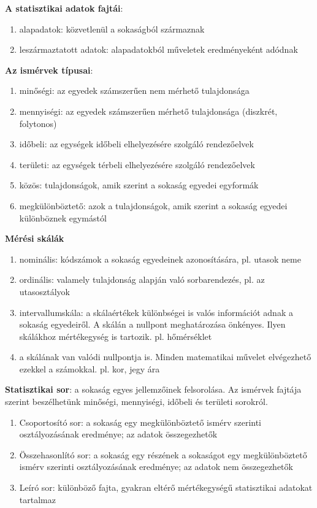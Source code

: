 \documentclass[12pt]{article}
\begin{document}
    \textbf{A statisztikai adatok fajtái}:
    \begin{enumerate}
        \item alapadatok: közvetlenül a sokaságból származnak
        \item leszármaztatott adatok: alapadatokból műveletek eredményeként adódnak
    \end{enumerate}

    \textbf{Az ismérvek típusai}:
    \begin{enumerate}
        \item minőségi: az egyedek számszerűen nem mérhető tulajdonsága
        \item mennyiségi: az egyedek számszerűen mérhető tulajdonsága (diszkrét, folytonos)
        \item időbeli: az egységek időbeli elhelyezésére szolgáló rendezőelvek
        \item területi: az egységek térbeli elhelyezésére szolgáló rendezőelvek
        \item közös: tulajdonságok, amik szerint a sokaság egyedei egyformák
        \item megkülönböztető: azok a tulajdonságok, amik szerint a sokaság egyedei különböznek egymástól
    \end{enumerate}

    \textbf{Mérési skálák}
    \begin{enumerate}
        \item nominális: kódszámok a sokaság egyedeinek azonosítására, pl. utasok neme
        \item ordinális: valamely tulajdonság alapján való sorbarendezés, pl. az utasosztályok
        \item intervallumskála: a skálaértékek különbségei is valós információt adnak a sokaság egyedeiről. A skálán a nullpont meghatározása önkényes. Ilyen skálákhoz mértékegység is tartozik. pl. hőmérséklet
        \item  a skálának van valódi nullpontja is. Minden matematikai művelet elvégezhető ezekkel a számokkal. pl. kor, jegy ára
    \end{enumerate}

    \textbf{Statisztikai sor}: a sokaság egyes jellemzőinek felsorolása. Az ismérvek fajtája szerint beszélhetünk minőségi, mennyiségi, időbeli és területi sorokról.
    \begin{enumerate}
        \item Csoportosító sor: a sokaság egy megkülönböztető ismérv szerinti osztályozásának eredménye; az adatok összegezhetők
        \item Összehasonlító sor: a sokaság egy részének a sokaságot egy megkülönböztető ismérv szerinti osztályozásának eredménye; az adatok nem összegezhetők
        \item Leíró sor: különböző fajta, gyakran eltérő mértékegységű statisztikai adatokat tartalmaz
    \end{enumerate}
\end{document}
